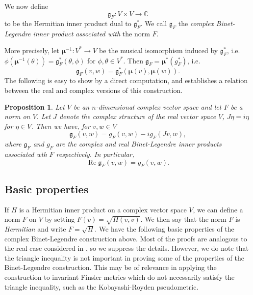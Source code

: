 \documentclass[a4paper,11pt,reqno]{amsart}
\theoremstyle{plain}
\newtheorem{proposition}[equation]{Proposition}
\theoremstyle{definition}
\theoremstyle{remark}
\theoremstyle{remark}
\numberwithin{equation}{section}
\newcommand{\tmop}[1]{\ensuremath{\operatorname{#1}}}
\renewcommand{\Re}{\tmop{Re}}
\newcommand{\cx}{{\mathbb C}}
\newcommand{\miso}{\bm{\mu}}
\newcommand{\g}{\mathfrak{g}}
\begin{document}
We now define
\[ \g_F:V\times V \to \cx\]
to be the Hermitian inner product dual to $\g^*_F$. We call $\g_F$ the \emph{ complex Binet-Legendre inner product associated with } the norm $F$.

More precisely, let $\miso^{-1}:V^*\to V$ be the 
musical isomorphism induced by $\g_F^*$, i.e. $\phi(\miso^{-1}(\theta))=\g_F^*(\theta,\phi)$ for $\phi,\theta\in V^*$.
Then $\g_F=\miso^* (g_F^*)$, i.e.
\begin{equation}
    \label{eq-BLdef}
    \g_F(v,w)= \g_F^*(\miso(v), \miso(w)).
\end{equation}
The following is easy to show by a direct computation, and establishes a relation between the real and complex 
versions of this construction. 
\begin{proposition} Let $V$ be an $n$-dimensional complex vector space and let $F$ be a norm on $V$. Let $J$ denote the complex
structure of the real vector space $V$,  $J\eta=i\eta$ for $\eta\in V$. Then we have, for $v,w\in V$
\begin{equation}
    \label{eq-realcomplex}
    \g_F(v,w)=g_F(v,w)-i g_F(Jv,w),
\end{equation}
where $\g_F$ and $g_F$ are the complex and real Binet-Legendre inner products associated wth $F$ respectively. In particular, 
\[ \Re \g_F(v,w)=g_F(v,w). \]
\end{proposition}

\subsection{Basic properties}If $H$ is a Hermitian inner product on a complex vector space $V$, we can define a  norm
$F$ on $V$ by setting $F(v)=\sqrt{H(v,v)}.$ We then say that the norm $F$ is \emph{Hermitian} and write $F= \sqrt{H}$.
We have the following basic properties of the complex Binet-Legendre construction above. Most of the proofs are 
analogous to the real case considered  in \cite[Proposition~12.1]{binet}, so we suppress the details. However, 
we do note that the triangle inequality is not important in proving some of the properties of the Binet-Legendre construction. This may be of relevance in applying the construction to invariant Finsler metrics which do not necessarily satisfy the triangle inequality, such as the Kobayashi-Royden pseudometric. 
\end{document}
